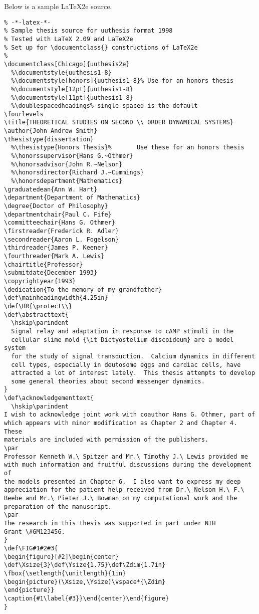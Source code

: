 Below is a sample \LaTeX{}2e source.


\begin{verbatim}
% -*-latex-*-
% Sample thesis source for uuthesis format 1998
% Tested with LaTeX 2.09 and LaTeX2e
% Set up for \documentclass{} constructions of LaTeX2e
%
\documentclass[Chicago]{uuthesis2e}
  %\documentstyle{uuthesis1-8}
  %\documentstyle[honors]{uuthesis1-8}% Use for an honors thesis
  %\documentstyle[12pt]{uuthesis1-8}
  %\documentstyle[11pt]{uuthesis1-8}
  %\doublespacedheadings% single-spaced is the default
\fourlevels
\title{THEORETICAL STUDIES ON SECOND \\ ORDER DYNAMICAL SYSTEMS}
\author{John Andrew Smith}
\thesistype{dissertation}
  %\thesistype{Honors Thesis}%       Use these for an honors thesis
  %\honorssupervisor{Hans G.~Othmer}
  %\honorsadvisor{John R.~Nelson}
  %\honorsdirector{Richard J.~Cummings}
  %\honorsdepartment{Mathematics}
\graduatedean{Ann W. Hart}
\department{Department of Mathematics}
\degree{Doctor of Philosophy}
\departmentchair{Paul C. Fife}
\committeechair{Hans G. Othmer}
\firstreader{Frederick R. Adler}
\secondreader{Aaron L. Fogelson}
\thirdreader{James P. Keener}
\fourthreader{Mark A. Lewis}
\chairtitle{Professor}
\submitdate{December 1993}
\copyrightyear{1993}
\dedication{To the memory of my grandfather}
\def\mainheadingwidth{4.25in}
\def\BR{\protect\\}
\def\abstracttext{
  \hskip\parindent
  Signal relay and adaptation in response to cAMP stimuli in the
  cellular slime mold {\it Dictyostelium discoideum} are a model system
  for the study of signal transduction.  Calcium dynamics in different
  cell types, especially in deutosome eggs and cardiac cells, have
  attracted a lot of interest lately.  This thesis attempts to develop
  some general theories about second messenger dynamics.
}
\def\acknowledgementtext{
  \hskip\parindent
I wish to acknowledge joint work with coauthor Hans G. Othmer, part of
which appears with minor modification as Chapter 2 and Chapter 4. These
materials are included with permission of the publishers.
\par
Professor Kenneth W.\ Spitzer and Mr.\ Timothy J.\ Lewis provided me
with much information and fruitful discussions during the development of
the models presented in Chapter 6.  I also want to express my deep
appreciation for the patient help received from Dr.\ Nelson H.\ F.\
Beebe and Mr.\ Pieter J.\ Bowman on my computational work and the
preparation of the manuscript.
\par
The research in this thesis was supported in part under NIH
Grant \#GM123456.
}
\def\FIG#1#2#3{
\begin{figure}[#2]\begin{center}
\def\Xsize{3}\def\Ysize{1.75}\def\Zdim{1.7in}
\fbox{\setlength{\unitlength}{1in}
\begin{picture}(\Xsize,\Ysize)\vspace*{\Zdim}
\end{picture}}
\caption{#1\label{#3}}\end{center}\end{figure}
}


\end{verbatim}
